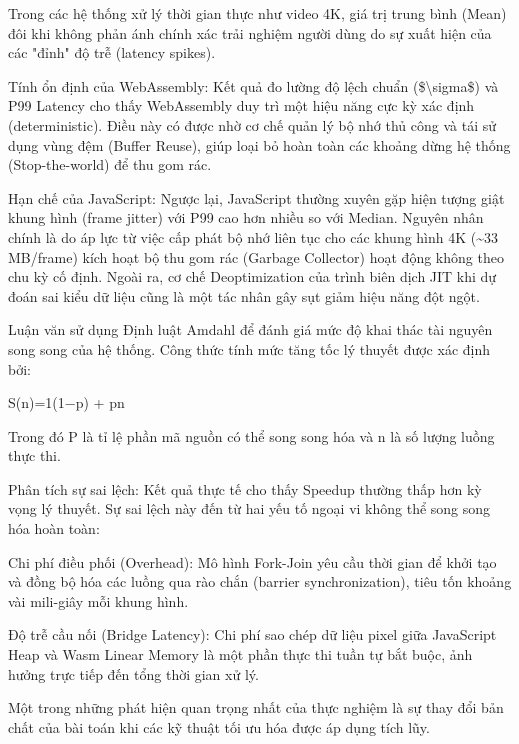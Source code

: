 
Trong các hệ thống xử lý thời gian thực như video 4K, giá trị trung bình (Mean) đôi khi không phản ánh chính xác trải nghiệm người dùng do sự xuất hiện của các "đỉnh" độ trễ (latency spikes).


Tính ổn định của WebAssembly: Kết quả đo lường độ lệch chuẩn (\$\textbackslash{}sigma\$) và P99 Latency cho thấy WebAssembly duy trì một hiệu năng cực kỳ xác định (deterministic). Điều này có được nhờ cơ chế quản lý bộ nhớ thủ công và tái sử dụng vùng đệm (Buffer Reuse), giúp loại bỏ hoàn toàn các khoảng dừng hệ thống (Stop-the-world) để thu gom rác.


Hạn chế của JavaScript: Ngược lại, JavaScript thường xuyên gặp hiện tượng giật khung hình (frame jitter) với P99 cao hơn nhiều so với Median. Nguyên nhân chính là do áp lực từ việc cấp phát bộ nhớ liên tục cho các khung hình 4K (\textasciitilde{}33 MB/frame) kích hoạt bộ thu gom rác (Garbage Collector) hoạt động không theo chu kỳ cố định. Ngoài ra, cơ chế Deoptimization của trình biên dịch JIT khi dự đoán sai kiểu dữ liệu cũng là một tác nhân gây sụt giảm hiệu năng đột ngột.



Luận văn sử dụng Định luật Amdahl để đánh giá mức độ khai thác tài nguyên song song của hệ thống. Công thức tính mức tăng tốc lý thuyết được xác định bởi:


S(n)=1(1−p) + pn


Trong đó P là tỉ lệ phần mã nguồn có thể song song hóa và n là số lượng luồng thực thi.


Phân tích sự sai lệch: Kết quả thực tế cho thấy Speedup thường thấp hơn kỳ vọng lý thuyết. Sự sai lệch này đến từ hai yếu tố ngoại vi không thể song song hóa hoàn toàn:


Chi phí điều phối (Overhead): Mô hình Fork-Join yêu cầu thời gian để khởi tạo và đồng bộ hóa các luồng qua rào chắn (barrier synchronization), tiêu tốn khoảng vài mili-giây mỗi khung hình.


Độ trễ cầu nối (Bridge Latency): Chi phí sao chép dữ liệu pixel giữa JavaScript Heap và Wasm Linear Memory là một phần thực thi tuần tự bắt buộc, ảnh hưởng trực tiếp đến tổng thời gian xử lý.



Một trong những phát hiện quan trọng nhất của thực nghiệm là sự thay đổi bản chất của bài toán khi các kỹ thuật tối ưu hóa được áp dụng tích lũy.


